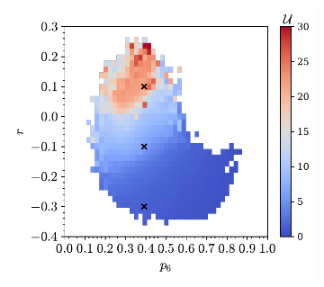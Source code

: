 \begin{figure}[bt]
     \centering
      \begin{subfigure}[b]{0.45\textwidth}
         \centering
         \includegraphics[width=\textwidth]{./figures/general_networks/energy_full92.pdf}
         \caption{}
         \label{fig:fullerene92u}
     \end{subfigure}
     \hfill
     
	\vspace{0.5cm}     
     

\end{figure}
